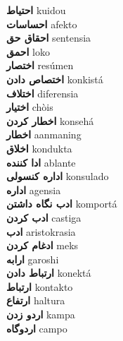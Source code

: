 \textbf{ احتیاط  } kuidou \\
\textbf{ احساسات  } afekto \\
\textbf{ احقاق حق  } sentensia \\
\textbf{ احمق  } loko \\
\textbf{ اختصار  } resúmen \\
\textbf{ اختصاص دادن  } konkistá \\
\textbf{ اختلاف  } diferensia \\
\textbf{ اختیار  } chòis \\
\textbf{ اخطار کردن  } konsehá \\
\textbf{ اخطار  } aanmaning \\
\textbf{ اخلاق  } kondukta \\
\textbf{ ادا کننده  } ablante \\
\textbf{ اداره کنسولی  } konsulado \\
\textbf{ اداره  } agensia \\
\textbf{ ادب نگاه داشتن  } komportá \\
\textbf{ ادب کردن  } castiga \\
\textbf{ ادب  } aristokrasia \\
\textbf{ ادغام کردن  } meks \\
\textbf{ ارابه  } garoshi \\
\textbf{ ارتباط دادن  } konektá \\
\textbf{ ارتباط  } kontakto \\
\textbf{ ارتفاع  } haltura \\
\textbf{ اردو زدن  } kampa \\
\textbf{ اردوگاه  } campo \\
